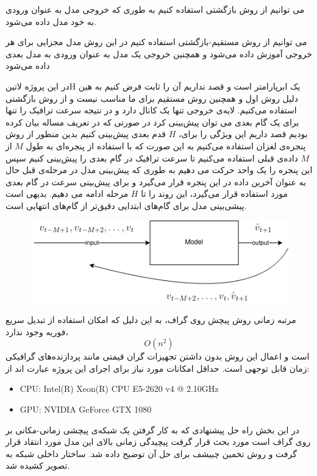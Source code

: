  می توانیم از روش بازگشتی  استفاده کنیم به طوری که خروجی مدل به عنوان ورودی به خود مدل داده می‌شود.

 می توانیم از روش مستقیم-بازگشتی  استفاده کنیم در این روش مدل مجزایی برای هر خروجی آموزش داده می‌شود و همچنین خروجی یک مدل به عنوان ورودی به مدل بعدی داده می‌شود


در این پروژه ‌لاتین{‌H} یک ابرپارامتر است و قصد نداریم آن را ثابت فرض کنیم به هین دلیل روش اول و همچنین روش مستقیم برای ما مناسب نیست و از روش بازگشتی استفاده می‌کنیم. لایه‌ی خروجی تنها یک کانال دارد و در نتیجه سرعت ترافیک را تنها برای یک گام بعدی می توان پیش‌بینی کرد در صورتی که در تعریف مساله بیان کرده بودیم قصد داریم این ویژگی را برای، $H$ قدم بعدی پیش‌بینی کنیم بدین منظور از روش پنجره‌ی لغزان استفاده می‌کنیم به این صورت که با استفاده از پنجره‌ای به طول $M$ از $M$ داده‌ی قبلی استفاده می‌کنیم تا سرعت ترافیک در گام بعدی را پیش‌بینی کنیم سپس این پنجره را یک واحد حرکت می دهیم به طوری که پیش‌بینی مدل در مرحله‌ی قبل حال به عنوان آخرین داده در این پنجره قرار می‌گیرد و برای پیش‌بینی سرعت در گام بعدی مورد استفاده قرار می‌گیرد، این روند را تا $H$ مرحله ادامه می دهیم. بدیهی است پیشی‌بینی مدل برای گام‌های ابتدایی دقیق‌تر از گام‌های انتهایی است.

\begin{figure}
  \includegraphics[width=\textwidth]{./images/recursive.png}
  \centering
  \label{fig:recursive}
\end{figure}



مرتبه زمانی روش پیچش روی گراف، به این دلیل که امکان استفاده از تبدیل سریع فوریه وجود ندارد،
\[
  O(n^{2})
\]
است و اعمال این روش بدون داشتن تجهیزات گران قیمتی مانند پردازنده‌های گرافیکی زمان قابل توجهی است. حداقل امکانات مورد نیاز برای اجرای این پروژه عبارت اند از:

\begin{latin}\begin{itemize}
\item CPU: Intel(R) Xeon(R) CPU E5-2620 v4 @ 2.10GHz
\item GPU: NVIDIA GeForce GTX 1080
\end{itemize}\end{latin}

در این بخش راه حل پیشنهادی که به کار گرفتن یک شبکه‌ی پیچشی زمانی-مکانی بر روی گراف است مورد بحث قرار گرفت پیچیدگی زمانی بالای این مدل مورد انتقاد قرار گرفت و روش تخمین چبیشف برای حل آن توضیح داده شد. ساختار داخلی شبکه به تصویر کشیده شد.

